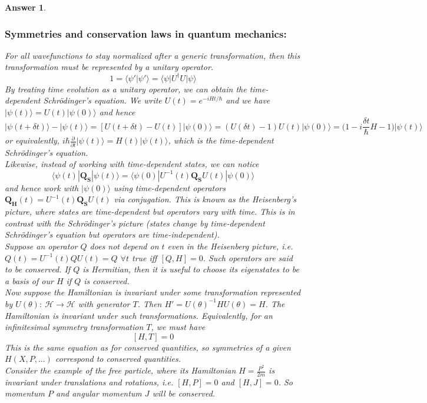 \documentclass[a4paper]{article}
\newtheorem{ans}{Answer}[subsection]
\theoremstyle{new}
\begin{document}
\begin{ans}\leavevmode
\subsubsection*{Symmetries and conservation laws in quantum mechanics:}
For all wavefunctions to stay normalized after a generic transformation, then this transformation must be represented by a unitary operator.
$$1=\langle\psi'|\psi'\rangle=\langle\psi|U^\dag U|\psi\rangle$$
By treating time evolution as a unitary operator, we can obtain the time-dependent Schr\"{o}dinger's equation.
We write $U(t)=e^{-iHt/\hbar}$ and we have $|\psi(t)\rangle=U(t)|\psi(0)\rangle$ and hence
$$|\psi(t+\delta t)\rangle-|\psi(t)\rangle=[U(t+\delta t)-U(t)]|\psi(0)\rangle=(U(\delta t)-1)U(t)|\psi(0)\rangle=\bigg(1-i\frac{\delta t}{\hbar}H-1\bigg)|\psi(t)\rangle$$
or equivalently, $i\hbar\frac{\partial}{\partial t}|\psi(t)\rangle=H(t)|\psi(t)\rangle$, which is the time-dependent Schr\"{o}dinger's equation.\\[5pt]
Likewise, instead of working with time-dependent states, we can notice $$\langle\psi(t)|\mathbf{Q_S}|\psi(t)\rangle=\langle\psi(0)|U^{-1}(t)\mathbf{Q_S}U(t)|\psi(0)\rangle$$ and hence work with $|\psi(0)\rangle$ using time-dependent operators $\mathbf{Q_H}(t)=U^{-1}(t)\mathbf{Q_S}U(t)$ via conjugation. This is known as the Heisenberg's picture, where states are time-dependent but operators vary with time. This is in contrast with the Schr\"{o}dinger's picture (states change by time-dependent Schr\"{o}dinger's equation but operators are time-independent).\\[5pt]
Suppose an operator $Q$ does not depend on $t$ even in the Heisenberg picture, i.e. $Q(t)=U^{-1}(t)QU(t)=Q$ $\forall t$ true iff $[Q,H]=0$. Such operators are said to be conserved. If $Q$ is Hermitian, then it is useful to choose its eigenstates to be a basis of our $H$ if $Q$ is conserved.\\[5pt]
Now suppose the Hamiltonian is invariant under some transformation represented by $U(\theta):~\mathcal{H}\rightarrow\mathcal{H}$ with generator $T$. Then $H'=U(\theta)^{-1}HU(\theta)=H$. The Hamiltonian is invariant under such transformations. Equivalently, for an infinitesimal symmetry transformation $T$, we must have
$$[H,T]=0$$
This is the same equation as for conserved quantities, so symmetries of a given $H(X,P,...)$ correspond to conserved quantities.\\[5pt]
Consider the example of the free particle, where its Hamiltonian $H=\frac{P^2}{2m}$ is invariant under translations and rotations, i.e. $[H,P]=0$ and $[H,J]=0$. So momentum $P$ and angular momentum $J$ will be conserved. 
\newpage

\end{ans}
\end{document}
